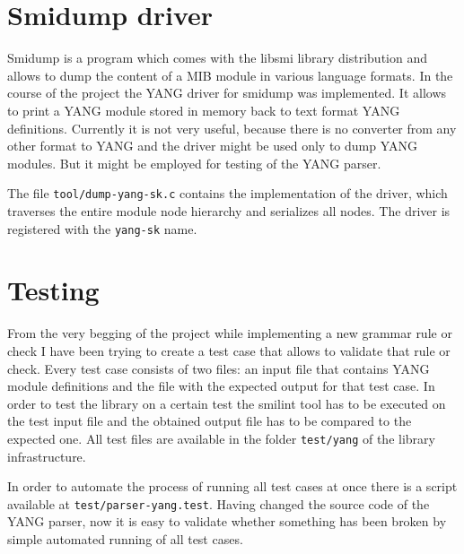 \documentclass[conference]{IEEEtran}
\begin{document}
\section{Smidump driver}
Smidump is a program which comes with the libsmi library distribution and allows to dump the content of a MIB module in various language formats. In the course of the project the YANG driver for smidump was implemented. It allows to print a YANG module stored in memory back to text format YANG definitions. Currently it is not very useful, because there is no converter from any other format to YANG and the driver might be used only to dump YANG modules. But it might be employed for testing of the YANG parser.

The file \texttt{tool/dump-yang-sk.c} contains the implementation of the driver, which traverses the entire module node hierarchy and serializes all nodes. The driver is registered with the \texttt{yang-sk} name.

\section{Testing}
From the very begging of the project  while implementing a new grammar rule or check I have been trying to create a test case that allows to validate that rule or check. Every test case consists of two files: an input file that contains YANG module definitions and the file with the expected output for that test case. In order to test the library on a certain test the smilint tool has to be executed on the test input file and the obtained output file has to be compared to the expected one. All test files are available in the folder 	\texttt{test/yang} of the library infrastructure.

In order to automate the process of running all test cases at once there is a script available at \texttt{test/parser-yang.test}. Having changed the source code of the YANG parser, now it is easy to validate whether something has been broken by simple automated running of all test cases.
\end{document}
